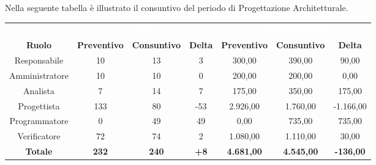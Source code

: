 Nella seguente tabella è illustrato il consuntivo del periodo di Progettazione Architetturale.


\begin{tabular}{c|ccc|ccc}
\rowcolor{greySWEight}
\multicolumn{1}{c}{} & \multicolumn{3}{c}{\textcolor{white}{\textbf{Ore}}} & \multicolumn{3}{c}{\textcolor{white}{\textbf{Costo in Euro}}} \\
{\textbf{Ruolo}} & {\textbf{Preventivo}} & {\textbf{Consuntivo}} & {\textbf{Delta}} & {\textbf{Preventivo}} & {\textbf{Consuntivo}} & {\textbf{Delta}} \\
Responsabile & 10 & 13 & 3 & 300,00 & 390,00 & 90,00 \\
Amministratore & 10 & 10 & 0 & 200,00 & 200,00 & 0,00 \\
Analista & 7 & 14 & 7 & 175,00 & 350,00 & 175,00 \\
Progettista & 133 & 80 & -53 & 2.926,00 & 1.760,00 & -1.166,00 \\
Programmatore & 0 & 49 & 49 & 0,00 & 735,00 & 735,00 \\
Verificatore & 72 & 74 & 2 & 1.080,00 & 1.110,00 & 30,00 \\
\hline
\textbf{Totale} & \textbf{232} & \textbf{240} & \textbf{+8} & \textbf{4.681,00} & \textbf{4.545,00} & \textbf{-136,00} \\
\end{tabular}